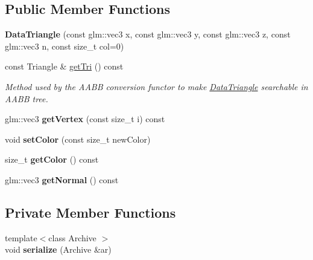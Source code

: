 \subsection*{Public Member Functions}
\begin{DoxyCompactItemize}
\item 
\mbox{\label{classpepr3d_1_1_data_triangle_af76827325dc5d207829d0f3d56691ee5}} 
{\bfseries Data\+Triangle} (const glm\+::vec3 x, const glm\+::vec3 y, const glm\+::vec3 z, const glm\+::vec3 n, const size\+\_\+t col=0)
\item 
\mbox{\label{classpepr3d_1_1_data_triangle_a9db49161808a4c5794e5537fe3b9d33b}} 
const Triangle \& \mbox{\hyperlink{classpepr3d_1_1_data_triangle_a9db49161808a4c5794e5537fe3b9d33b}{get\+Tri}} () const
\begin{DoxyCompactList}\small\item\em Method used by the A\+A\+BB conversion functor to make \mbox{\hyperlink{classpepr3d_1_1_data_triangle}{Data\+Triangle}} searchable in A\+A\+BB tree. \end{DoxyCompactList}\item 
\mbox{\label{classpepr3d_1_1_data_triangle_a0fdf44e9dc19765d14fa7a22d6e80c46}} 
glm\+::vec3 {\bfseries get\+Vertex} (const size\+\_\+t i) const
\item 
\mbox{\label{classpepr3d_1_1_data_triangle_aea11c4f8f882393f928d49ab65719792}} 
void {\bfseries set\+Color} (const size\+\_\+t new\+Color)
\item 
\mbox{\label{classpepr3d_1_1_data_triangle_a6aa86de585ed3546a23b6b916d80fb88}} 
size\+\_\+t {\bfseries get\+Color} () const
\item 
\mbox{\label{classpepr3d_1_1_data_triangle_ad18faef6aa1ae347540214be33d8b4a8}} 
glm\+::vec3 {\bfseries get\+Normal} () const
\end{DoxyCompactItemize}
\subsection*{Private Member Functions}
\begin{DoxyCompactItemize}
\item 
\mbox{\label{classpepr3d_1_1_data_triangle_a7c7bbbf69427a3c1417f03cac67890bc}} 
{\footnotesize template$<$class Archive $>$ }\\void {\bfseries serialize} (Archive \&ar)
\end{DoxyCompactItemize}
